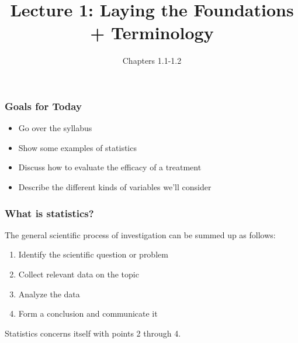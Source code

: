 \documentclass[slides]{beamer}
\title{Lecture 1: Laying the Foundations + Terminology}
\author{Chapters 1.1-1.2}
\date{}
\newcommand{\blue}[1]{\textcolor{blue2}{#1}}
\begin{document}
\begin{frame}
\titlepage
\end{frame}


\begin{frame}
\frametitle{Goals for Today}
\begin{itemize}
  \item Go over the syllabus 
  \item Show some examples of statistics
  \item Discuss how to evaluate the efficacy of a \blue{treatment}
  \item Describe the different kinds of \blue{variables} we'll consider
\end{itemize}

\end{frame}


\begin{frame}
\frametitle{What is statistics?}

The general scientific process of investigation can be summed up as follows:

\begin{enumerate}
\pause\item Identify the scientific question or problem
\pause\item Collect relevant data on the topic
\pause\item Analyze the data
\pause\item Form a conclusion and communicate it
\end{enumerate}

\pause Statistics concerns itself with points 2 through 4.

\end{frame}
\end{document}
